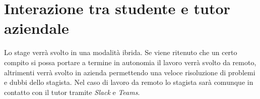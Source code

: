 \section*{Interazione tra studente e tutor aziendale}

Lo stage verrà svolto in una modalità ibrida. Se viene ritenuto che un certo compito si possa portare a termine in autonomia il lavoro verrà svolto da remoto, altrimenti verrà svolto in azienda permettendo una veloce risoluzione di problemi e dubbi dello stagista. Nel caso di lavoro da remoto lo stagista sarà comunque in contatto con il tutor tramite \textit{Slack} e \textit{Teams}.
